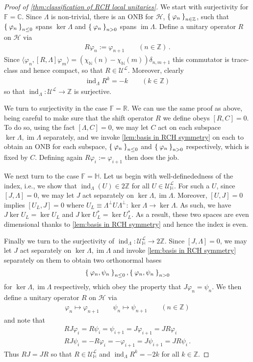 \documentclass[a4paper,10pt]{article}
\numberwithin{equation}{section}
\theoremstyle{plain}
\theoremstyle{plain}
\theoremstyle{plain}
\theoremstyle{plain}
\theoremstyle{plain}
\theoremstyle{remark}
\theoremstyle{definition}
\theoremstyle{plain}
\newcommand{\ZZ}{\mathbb{Z}}
\newcommand{\NN}{\mathbb{N}}
\newcommand{\RR}{\mathbb{R}}
\newcommand{\CC}{\mathbb{C}}
\newcommand{\FF}{\mathbb{F}}
\newcommand{\calU}{\mathcal{U}}
\newcommand{\calH}{\mathcal{H}}
\newcommand{\calL}{\mathcal{L}}
\newcommand{\ip}[2]{\langle #1, #2 \rangle}
\newcommand{\vf}{\varphi}
\newcommand{\HH}{\mathbb{H}}
\newcommand{\findex}{\operatorname{ind}}
\newcommand{\im}{\operatorname{im}}
\newcommand{\eq}[1]{\begin{align*}#1\end{align*}}
\newcommand{\eql}[1]{\begin{align}#1\end{align}}
\begin{document}
	
	\begin{proof}[Proof of \cref{thm:classification of RCH local unitaries}] 
		
		We start with surjectivity for $\FF=\CC$. Since $\Lambda$ is non-trivial, there is an ONB for $\calH$, $\Set{\vf_n}_{n\in\ZZ}$, such that $\Set{\vf_n}_{n\leq0}$ spans $\ker\Lambda$ and $\Set{\vf_n}_{n>0}$ spans $\im\Lambda$. Define a unitary operator $R$ on $\calH$ via \eq{R\vf_n := \vf_{n+1}\qquad(n\in\ZZ)\,.} Since $\ip{\vf_n}{[R,\Lambda]\vf_m}=\left(\chi_\NN(n)-\chi_\NN(m)\right)\delta_{n,m+1}$ this commutator is trace-class and hence compact, so that $R\in\calU^\calL$. Moreover, clearly  \eq{\findex_\Lambda R^k = -k\qquad(k\in\ZZ)} so that $\findex_\Lambda:\calU^\calL\to\ZZ$ is surjective. 
		
		
		We turn to surjectivity in the case  $\FF=\RR$. We can use the same proof as above, being careful to make sure that the shift operator $R$ we define obeys $[R,C]=0$. To do so, using the fact $[\Lambda,C]=0$, we may let $C$ act on each subspace $\ker\Lambda,\im\Lambda$ separately, and we invoke \cref{lem:basis in RCH symmetry} on each to obtain an ONB for each subspace, $\Set{\vf_n}_{n\leq0}$ and $\Set{\vf_n}_{n>0}$ respectively, which is fixed by $C$. Defining again $R\vf_i:=\vf_{i+1}$ then does the job.
		
		We next turn to the case $\FF=\HH$. Let us begin with well-definededness of the index, i.e., we show that $\findex_\Lambda(U)\in 2\ZZ$ for all $U\in\calU_\HH^\calL$. For such a $U$, since $[J,\Lambda]=0$, we may let $J$ act separately on $\ker\Lambda,\im\Lambda$. Moreover, $[U,J]=0$ implies $[U_L,J]=0$ where $U_L\equiv\Lambda^\perp U \Lambda^\perp:\ker\Lambda\to\ker\Lambda$. As such, we have $J\ker U_L=\ker U_L$ and $J \ker U_L^\ast = \ker U_L^\ast$. As a result, these two spaces are even dimensional thanks to \cref{lem:basis in RCH symmetry} and hence the index is even.
		
		Finally we turn to the surjectivity of $\findex_\Lambda:\calU^\calL_\HH\to2\ZZ$. Since $[J,\Lambda]=0$, we may let $J$ act separately on $\ker\Lambda,\im\Lambda$ and invoke \cref{lem:basis in RCH symmetry} separately on them to obtain two orthonormal bases \eql{\label{eq:J equivariant basis for ker im Lambda}\Set{\vf_n,\psi_n}_{n\leq0},\Set{\vf_n,\psi_n}_{n>0}} for $\ker\Lambda,\im\Lambda$ respectively, which obey the property that $J\vf_n=\psi_n$. We then define a unitary operator $R$ on $\calH$ via \eq{\vf_n\mapsto\vf_{n+1}\qquad\psi_n\mapsto\psi_{n+1}\qquad(n\in\ZZ)} and note that \eq{RJ\varphi_i=R\psi_i=\psi_{i+1}=J\varphi_{i+1}=JR\varphi_i \\ RJ\psi_i=-R\varphi_i=-\varphi_{i+1}=J\psi_{i+1}=JR\psi_i\,.} Thus $RJ=JR$ so that $R\in\calU^\calL_\HH$ and $\findex_\Lambda R^k=-2k$ for all $k\in\ZZ$.
		

\end{proof}
\end{document}
